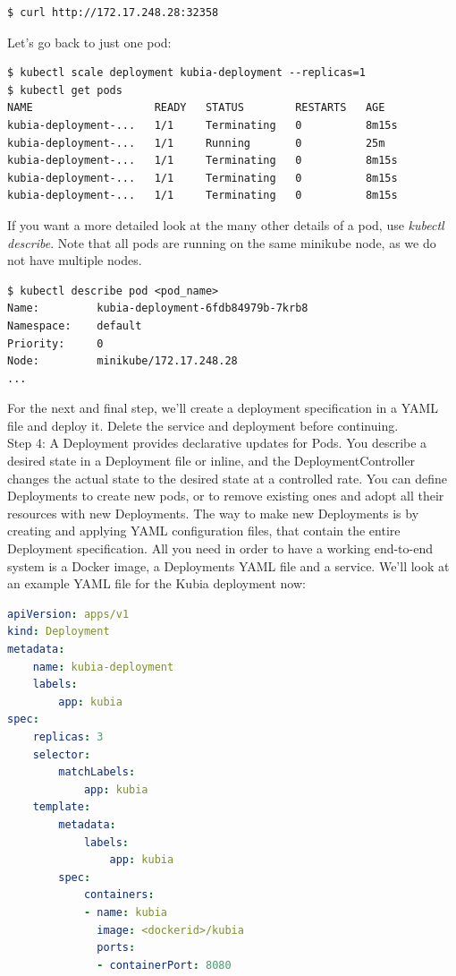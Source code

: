 \documentclass[a4paper,10pt]{article}
\begin{document}
\begin{lstlisting}[numbers=none, basicstyle=\mdseries]
$ curl http://172.17.248.28:32358
\end{lstlisting}

Let's go back to just one pod:

\begin{lstlisting}[numbers=none, basicstyle=\ttfamily]
$ kubectl scale deployment kubia-deployment --replicas=1
$ kubectl get pods
NAME                   READY   STATUS        RESTARTS   AGE
kubia-deployment-...   1/1     Terminating   0          8m15s
kubia-deployment-...   1/1     Running       0          25m
kubia-deployment-...   1/1     Terminating   0          8m15s
kubia-deployment-...   1/1     Terminating   0          8m15s
kubia-deployment-...   1/1     Terminating   0          8m15s
\end{lstlisting}

If you want a more detailed look at the many other details of a pod, use \textit{kubectl describe}. Note that all pods are running on the same minikube node, as we do not have multiple nodes.

\begin{lstlisting}[numbers=none, basicstyle=\mdseries]
$ kubectl describe pod <pod_name>
Name:         kubia-deployment-6fdb84979b-7krb8
Namespace:    default
Priority:     0
Node:         minikube/172.17.248.28
...
\end{lstlisting}

For the next and final step, we'll create a deployment specification in a YAML file and deploy it. Delete the service and deployment before continuing. \\

Step 4: A Deployment provides declarative updates for Pods. You describe a desired state in a Deployment file or inline, and the DeploymentController changes the actual state to the desired state at a controlled rate. You can define Deployments to create new pods, or to remove existing ones and adopt all their resources with new Deployments. The way to make new Deployments is by creating and applying YAML configuration files, that contain the entire Deployment specification. All you need in order to have a working end-to-end system is a Docker image, a Deployments YAML file and a service. We'll look at an example YAML file for the Kubia deployment now:

\newpage

\begin{lstlisting}[language=yaml, numbers=none, frame=single]
apiVersion: apps/v1
kind: Deployment
metadata:
	name: kubia-deployment
	labels:
		app: kubia
spec:
	replicas: 3
	selector:
		matchLabels:
			app: kubia
	template:
		metadata:
			labels:
				app: kubia
		spec:
			containers:
			- name: kubia
			  image: <dockerid>/kubia
			  ports:
			  - containerPort: 8080
\end{lstlisting}
\end{document}
